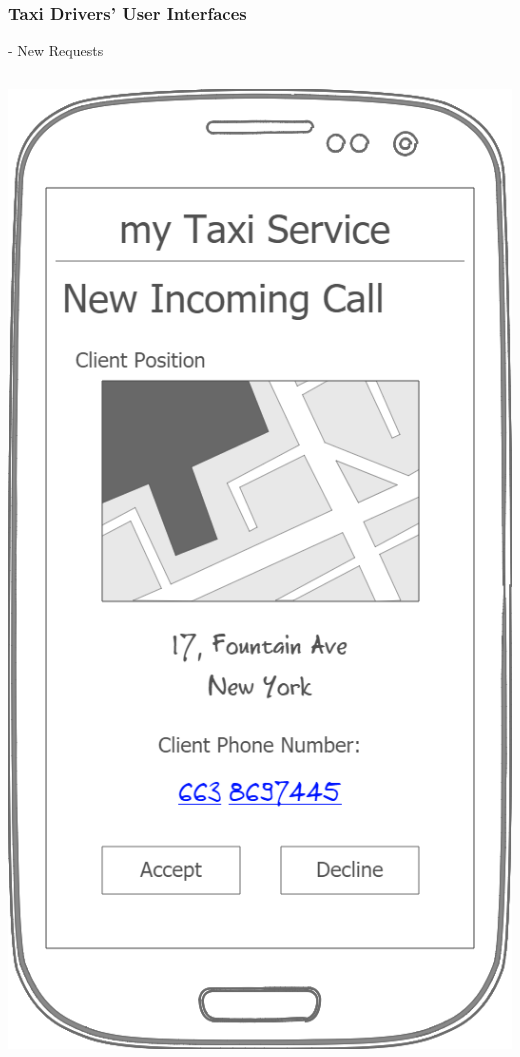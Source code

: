 \documentclass[9pt]{beamer}
\makeatletter
\newcommand*{\currentname}{\@currentlabelname}
\makeatother
\begin{document}
\subsubsection{Taxi Drivers' User Interfaces}
\begin{frame}{\currentname{} - New Requests}
\begin{columns}[c]
  \begin{column}{.5\textwidth}
		\includegraphics[height=.8\textheight]{Mockup-TaxiDriversNewIncomingCall}

\end{column}
\end{columns}
\end{frame}
\end{document}
